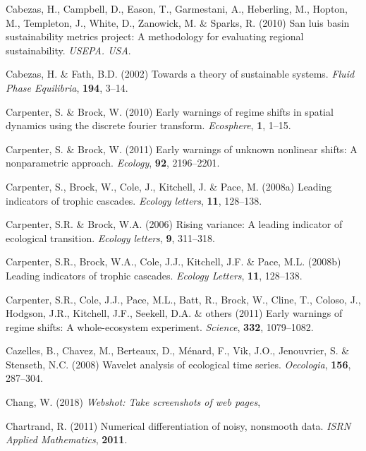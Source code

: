 \documentclass[12pt,twoside,openany]{reedthesis}
\begin{document}
\leavevmode\hypertarget{ref-cabezas_san_2010}{}%
Cabezas, H., Campbell, D., Eason, T., Garmestani, A., Heberling, M., Hopton, M., Templeton, J., White, D., Zanowick, M. \& Sparks, R. (2010) San luis basin sustainability metrics project: A methodology for evaluating regional sustainability. \emph{USEPA. USA}.

\leavevmode\hypertarget{ref-cabezas_towards_2002}{}%
Cabezas, H. \& Fath, B.D. (2002) Towards a theory of sustainable systems. \emph{Fluid Phase Equilibria}, \textbf{194}, 3--14.

\leavevmode\hypertarget{ref-carpenter2010early}{}%
Carpenter, S. \& Brock, W. (2010) Early warnings of regime shifts in spatial dynamics using the discrete fourier transform. \emph{Ecosphere}, \textbf{1}, 1--15.

\leavevmode\hypertarget{ref-carpenterBrock2011early}{}%
Carpenter, S. \& Brock, W. (2011) Early warnings of unknown nonlinear shifts: A nonparametric approach. \emph{Ecology}, \textbf{92}, 2196--2201.

\leavevmode\hypertarget{ref-carpenter2008leading}{}%
Carpenter, S., Brock, W., Cole, J., Kitchell, J. \& Pace, M. (2008a) Leading indicators of trophic cascades. \emph{Ecology letters}, \textbf{11}, 128--138.

\leavevmode\hypertarget{ref-carpenter2006rising}{}%
Carpenter, S.R. \& Brock, W.A. (2006) Rising variance: A leading indicator of ecological transition. \emph{Ecology letters}, \textbf{9}, 311--318.

\leavevmode\hypertarget{ref-carpenter_leading_2008}{}%
Carpenter, S.R., Brock, W.A., Cole, J.J., Kitchell, J.F. \& Pace, M.L. (2008b) Leading indicators of trophic cascades. \emph{Ecology Letters}, \textbf{11}, 128--138.

\leavevmode\hypertarget{ref-carpenter2011early}{}%
Carpenter, S.R., Cole, J.J., Pace, M.L., Batt, R., Brock, W., Cline, T., Coloso, J., Hodgson, J.R., Kitchell, J.F., Seekell, D.A. \& others (2011) Early warnings of regime shifts: A whole-ecosystem experiment. \emph{Science}, \textbf{332}, 1079--1082.

\leavevmode\hypertarget{ref-cazelles2008wavelet}{}%
Cazelles, B., Chavez, M., Berteaux, D., Ménard, F., Vik, J.O., Jenouvrier, S. \& Stenseth, N.C. (2008) Wavelet analysis of ecological time series. \emph{Oecologia}, \textbf{156}, 287--304.

\leavevmode\hypertarget{ref-webshot}{}%
Chang, W. (2018) \emph{Webshot: Take screenshots of web pages},

\leavevmode\hypertarget{ref-chartrand2011numerical}{}%
Chartrand, R. (2011) Numerical differentiation of noisy, nonsmooth data. \emph{ISRN Applied Mathematics}, \textbf{2011}.
\end{document}
